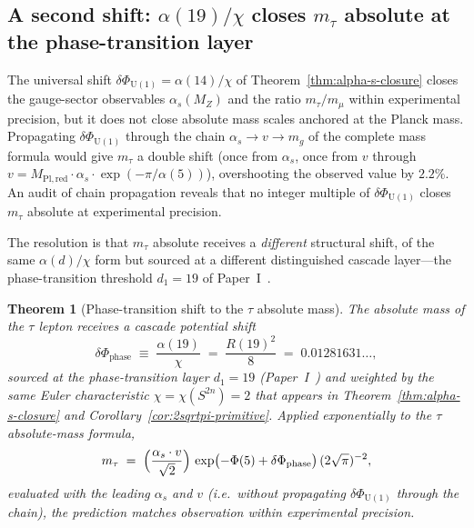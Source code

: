 \documentclass[12pt,a4paper]{article}
\newtheorem{theorem}{Theorem}[section]
\begin{document}
\subsection{A second shift: \texorpdfstring{$\alpha(19)/\chi$ closes $m_\tau$}{alpha(19)/chi closes m\_tau} absolute at the phase-transition layer}

The universal shift $\delta\Phi_{\mathrm{U}(1)}=\alpha(14)/\chi$ of Theorem~\ref{thm:alpha-s-closure} closes the gauge-sector observables $\alpha_s(M_Z)$ and the ratio $m_\tau/m_\mu$ within experimental precision, but it does not close absolute mass scales anchored at the Planck mass. Propagating $\delta\Phi_{\mathrm{U}(1)}$ through the chain $\alpha_s\to v\to m_g$ of the complete mass formula would give $m_\tau$ a double shift (once from $\alpha_s$, once from $v$ through $v = M_{\mathrm{Pl,red}}\cdot\alpha_s\cdot\exp(-\pi/\alpha(5))$), overshooting the observed value by $2.2\%$. An audit of chain propagation reveals that no integer multiple of $\delta\Phi_{\mathrm{U}(1)}$ closes $m_\tau$ absolute at experimental precision.

The resolution is that $m_\tau$ absolute receives a \emph{different} structural shift, of the same $\alpha(d)/\chi$ form but sourced at a different distinguished cascade layer---the phase-transition threshold $d_1=19$ of Paper~I~\cite{part0}.

\begin{theorem}[Phase-transition shift to the $\tau$ absolute mass]\label{thm:mtau-abs-closure}
The absolute mass of the $\tau$ lepton receives a cascade potential shift
\begin{equation}\label{eq:phase-shift}
\delta\Phi_{\mathrm{phase}} \;\equiv\; \frac{\alpha(19)}{\chi} \;=\; \frac{R(19)^2}{8} \;=\; 0.01281631\ldots,
\end{equation}
sourced at the phase-transition layer $d_1=19$ (Paper~I~\cite{part0}) and weighted by the same Euler characteristic $\chi=\chi(S^{2n})=2$ that appears in Theorem~\ref{thm:alpha-s-closure} and Corollary~\ref{cor:2sqrtpi-primitive}. Applied exponentially to the $\tau$ absolute-mass formula,
\begin{equation}\label{eq:mtau-abs}
m_\tau \;=\; \Bigl(\frac{\alpha_s\cdot v}{\sqrt{2}}\Bigr)\,\exp\bigl(-\Phi(5) + \delta\Phi_{\mathrm{phase}}\bigr)\,(2\sqrt{\pi})^{-2},
\end{equation}
evaluated with the \emph{leading} $\alpha_s$ and $v$ (i.e.\ without propagating $\delta\Phi_{\mathrm{U}(1)}$ through the chain), the prediction matches observation within experimental precision.
\end{theorem}
\end{document}
